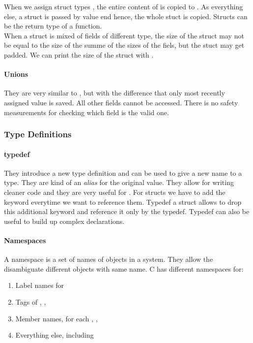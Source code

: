 When we assign struct types , the entire content of  is copied to . As everything else, a struct is passed by value end hence, the whole stuct is copied. Structs can be the return type of a function.\\
When a struct is mixed of fields of different type, the size of the struct may not be equal to the size of the summe of the sizes of the fiels, but the stuct may get padded. We can print the size of the struct with .

\paragraph{Unions}
They are very similar to , but with the difference that only most recently assigned value is saved. All other fields cannot be accessed. There is no safety measurements for checking which field is the valid one.

\subsubsection{Type Definitions}
\paragraph{typedef}
They introduce a new type definition and can be used to give a new name to a type. They are kind of an \textit{alias} for the original value. They allow for writing cleaner code and they are very useful for . For structs we have to add the  keyword everytime we want to reference them. Typedef a struct allows to drop this additional keyword and reference it only by the typedef. Typedef can also be useful to build up complex declarations.

\paragraph{Namespaces}
A namespace is a set of names of objects in a system. They allow the disambiguate different objects with same name. C has different namespaces for:
\begin{enumerate}
    \item Label names for 
    \item Tags of , , 
    \item Member names, for each , , 
    \item Everything else, including 
\end{enumerate}


